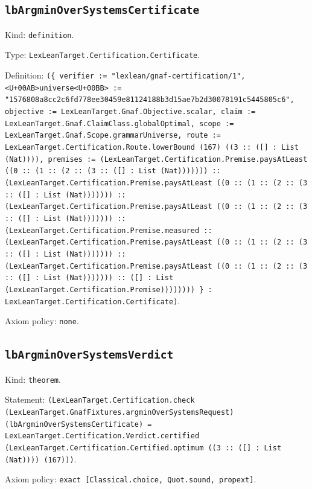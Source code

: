 \documentclass[11pt]{article}
\begin{document}
\subsection*{\texttt{lbArgminOverSystemsCertificate}}
\noindent Kind: \texttt{definition}.\par
\noindent Type: \texttt{LexLeanTarget.Certification.Certificate}.\par
\noindent Definition: \texttt{(\{ verifier := "lexlean/gnaf-certification/1", <U+00AB>universe<U+00BB> := "1576808a8cc2c6fd778ee30459e81124188b3d15ae7b2d30078191c5445805c6", objective := LexLeanTarget.Gnaf.Objective.scalar, claim := LexLeanTarget.Gnaf.ClaimClass.globalOptimal, scope := LexLeanTarget.Gnaf.Scope.grammarUniverse, route := LexLeanTarget.Certification.Route.lowerBound (167) ((3 :: ([] : List (Nat)))), premises := (LexLeanTarget.Certification.Premise.paysAtLeast ((0 :: (1 :: (2 :: (3 :: ([] : List (Nat))))))) :: (LexLeanTarget.Certification.Premise.paysAtLeast ((0 :: (1 :: (2 :: (3 :: ([] : List (Nat))))))) :: (LexLeanTarget.Certification.Premise.paysAtLeast ((0 :: (1 :: (2 :: (3 :: ([] : List (Nat))))))) :: (LexLeanTarget.Certification.Premise.measured :: (LexLeanTarget.Certification.Premise.paysAtLeast ((0 :: (1 :: (2 :: (3 :: ([] : List (Nat))))))) :: (LexLeanTarget.Certification.Premise.paysAtLeast ((0 :: (1 :: (2 :: (3 :: ([] : List (Nat))))))) :: ([] : List (LexLeanTarget.Certification.Premise)))))))) \} : LexLeanTarget.Certification.Certificate)}.\par
\noindent Axiom policy: \texttt{none}.\par
\subsection*{\texttt{lbArgminOverSystemsVerdict}}
\noindent Kind: \texttt{theorem}.\par
\noindent Statement: \texttt{(LexLeanTarget.Certification.check (LexLeanTarget.GnafFixtures.argminOverSystemsRequest) (lbArgminOverSystemsCertificate) = LexLeanTarget.Certification.Verdict.certified (LexLeanTarget.Certification.Certified.optimum ((3 :: ([] : List (Nat)))) (167)))}.\par
\noindent Axiom policy: \texttt{exact [Classical.choice, Quot.sound, propext]}.\par
\end{document}
